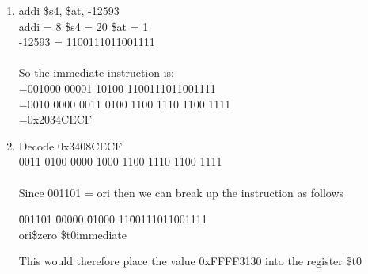 \documentclass[11pt,fleqn]{article}
\begin{document}
\begin{enumerate}
\item addi \$s4, \$at, -12593 \\
addi = 8 
\$s4 = 20 
\$at = 1 \\
-12593 = 1100111011001111 \\
\\
So the immediate instruction is: \\
=001000 00001 10100 1100111011001111 \\
=0010 0000 0011 0100 1100 1110 1100 1111 \\ 
=0x2034CECF
\item Decode 0x3408CECF \\
0011 0100 0000 1000 1100 1110 1100 1111 \\
\\Since 001101 = ori then we can break up the instruction as follows
\begin{tabbing}
\=001101 \=00000 \=01000 11\=00111011001111 \\
\>ori\>\$zero\> \$t0\>immediate
\end{tabbing}
This would therefore place the value 0xFFFF3130 into the register \$t0
 


\end{enumerate}
\end{document}
